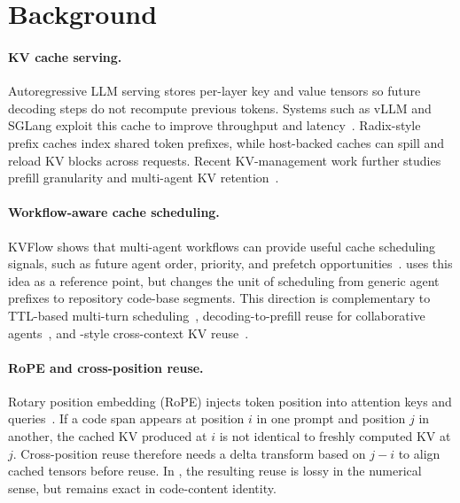 \section{Background}

\paragraph{KV cache serving.}
Autoregressive LLM serving stores per-layer key and value tensors so future decoding steps do not recompute previous tokens.
Systems such as vLLM and SGLang exploit this cache to improve throughput and latency~\cite{kwon2023vllm,zheng2023sglang}.
Radix-style prefix caches index shared token prefixes, while host-backed caches can spill and reload KV blocks across requests.
Recent KV-management work further studies prefill granularity and multi-agent KV retention~\cite{contiguouskv,tokencake2025}.

\paragraph{Workflow-aware cache scheduling.}
KVFlow shows that multi-agent workflows can provide useful cache scheduling signals, such as future agent order, priority, and prefetch opportunities~\cite{kvflow2025}.
\system uses this idea as a reference point, but changes the unit of scheduling from generic agent prefixes to repository code-base segments.
This direction is complementary to TTL-based multi-turn scheduling~\cite{continuum}, decoding-to-prefill reuse for collaborative agents~\cite{relaycaching}, and \kvcomm-style cross-context KV reuse~\cite{kvcomm2025}.

\paragraph{RoPE and cross-position reuse.}
Rotary position embedding (RoPE) injects token position into attention keys and queries~\cite{su2021rope}.
If a code span appears at position $i$ in one prompt and position $j$ in another, the cached KV produced at $i$ is not identical to freshly computed KV at $j$.
Cross-position reuse therefore needs a delta transform based on $j-i$ to align cached tensors before reuse.
In \system, the resulting reuse is lossy in the numerical sense, but remains exact in code-content identity.

